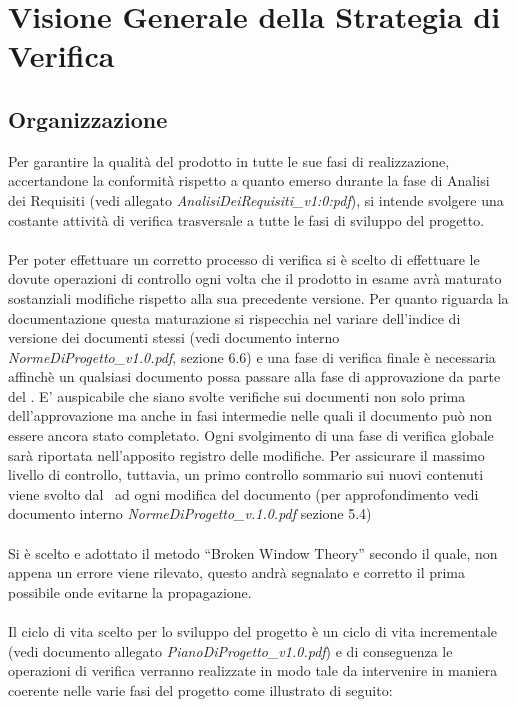 \section{Visione Generale della Strategia di Verifica}

\subsection{Organizzazione}

Per garantire la qualità del prodotto in tutte le sue fasi di realizzazione, accertandone la conformità rispetto a quanto emerso durante la fase di Analisi dei Requisiti (vedi allegato \textit{AnalisiDeiRequisiti\_v1:0:pdf}), si intende svolgere una costante attività di verifica trasversale a tutte le fasi di sviluppo del progetto.\\ \\
Per poter effettuare un corretto processo di verifica si è scelto di effettuare le
dovute operazioni di controllo ogni volta che il prodotto in esame avrà maturato sostanziali modifiche rispetto alla sua precedente versione. Per quanto riguarda la documentazione questa maturazione si rispecchia nel variare dell'indice di versione dei documenti stessi (vedi documento interno \textit{NormeDiProgetto\_v1.0.pdf}, sezione 6.6) e una fase di verifica finale è necessaria affinchè un qualsiasi documento possa passare alla fase di approvazione da parte del \ruoloResponsabile. E' auspicabile che siano svolte verifiche sui documenti non solo prima dell'approvazione ma anche in fasi intermedie nelle quali il documento può non essere ancora stato completato. Ogni svolgimento di una fase di verifica globale sarà riportata nell'apposito registro delle modifiche. Per assicurare il massimo livello di controllo, tuttavia, un primo controllo sommario sui nuovi contenuti viene svolto dal \ruoloVerificatore\ ad ogni modifica del documento (per approfondimento vedi documento interno  \textit{NormeDiProgetto\_v.1.0.pdf} sezione 5.4)
\\ \\
Si è scelto e adottato il metodo ``Broken Window Theory'' secondo il quale, non appena un errore viene rilevato, questo andrà segnalato e corretto il prima possibile onde evitarne la propagazione.
\\ \\
Il ciclo di vita scelto per lo sviluppo del progetto è un ciclo di vita incrementale (vedi documento allegato \textit{PianoDiProgetto\_v1.0.pdf}) e di conseguenza le
operazioni di verifica verranno realizzate in modo tale da intervenire in maniera
coerente nelle varie fasi del progetto come illustrato di seguito:


